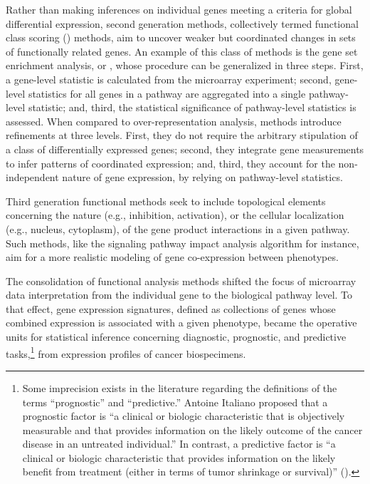 Rather than making inferences on individual genes meeting a criteria for global
differential expression, second generation methods, collectively termed
functional class scoring () methods, aim to uncover weaker but
coordinated changes in sets of functionally related genes.  An example of this
class of methods is the gene set enrichment analysis, or , whose
procedure can be generalized in three steps.  First, a gene-level statistic is
calculated from the microarray experiment; second, gene-level statistics for all
genes in a pathway are aggregated into a single pathway-level statistic; and,
third, the statistical significance of pathway-level statistics is assessed.
When compared to over-representation analysis,  methods introduce
refinements at three levels.  First, they do not require the arbitrary
stipulation of a class of differentially expressed genes; second, they integrate
gene measurements to infer patterns of coordinated expression; and, third, they
account for the non-independent nature of gene expression, by relying on
pathway-level statistics.

Third generation functional methods seek to include topological elements
concerning the nature (e.g., inhibition, activation), or the cellular
localization (e.g., nucleus, cytoplasm), of the gene product interactions in a
given pathway.  Such methods, like the signaling pathway impact analysis
algorithm\cite{tarca_novel_2009} for instance, aim for a more realistic modeling
of gene co-expression between phenotypes.

The consolidation of functional analysis methods shifted the focus of microarray
data interpretation from the individual gene to the biological pathway level.
To that effect, gene expression signatures, defined as collections of genes
whose combined expression is associated with a given phenotype, became the
operative units for statistical inference concerning diagnostic, prognostic, and
predictive tasks,\footnote{Some imprecision exists in the literature regarding
  the definitions of the terms ``prognostic'' and ``predictive.''  Antoine
  Italiano proposed that a prognostic factor is ``a clinical or biologic
  characteristic that is objectively measurable and that provides information on
  the likely outcome of the cancer disease in an untreated individual.''  In
  contrast, a predictive factor is ``a clinical or biologic characteristic that
  provides information on the likely benefit from treatment (either in terms of
  tumor shrinkage or survival)'' (\citealp{italiano_prognostic_2011}).} from
expression profiles of cancer biospecimens.  %

